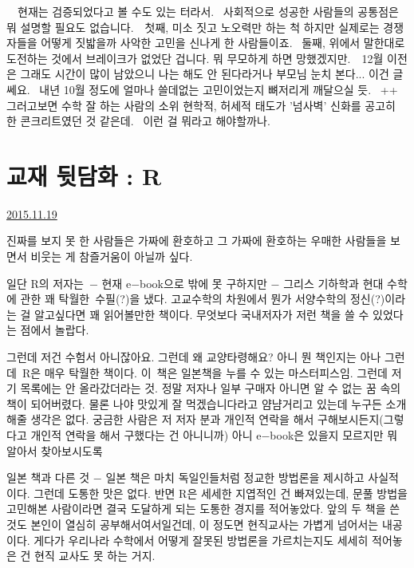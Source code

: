   현재는 검증되었다고 볼 수도 있는 터라서.  사회적으로 성공한 사람들의 공통점은 뭐 설명할 필요도 없습니다.  첫째, 미소 짓고 노오력만 하는 척 하지만 실제로는 경쟁자들을 어떻게 짓밟을까 사악한 고민을 신나게 한 사람들이죠.  둘째, 위에서 말한대로 도전하는 것에서 브레이크가 없었단 겁니다. 뭐 무모하게 하면 망했겠지만.  12월 이전은 그래도 시간이 많이 남았으니 나는 해도 안 된다라거나 부모님 눈치 본다... 이건 글쎄요.  내년 10월 정도에 얼마나 쓸데없는 고민이었는지 뼈저리게 깨달으실 듯.  ++  그러고보면 수학 잘 하는 사람의 소위 현학적, 허세적 태도가 '넘사벽' 신화를 공고히 한 콘크리트였던 것 같은데.  이런 걸 뭐라고 해야할까나.




\section{교재 뒷담화 : R}
\href{https://www.kockoc.com/Apoc/500147}{2015.11.19}

\vspace{5mm}

진짜를 보지 못 한 사람들은 가짜에 환호하고
그 가짜에 환호하는 우매한 사람들을 보면서 비웃는 게 참즐거움이 아닐까 싶다.
\vspace{5mm}

일단 R의 저자는 $-$ 현재 e$-$book으로 밖에 못 구하지만 $-$
그리스 기하학과 현대 수학에 관한 꽤 탁월한 수필(?)을 냈다.
고교수학의 차원에서 뭔가 서양수학의 정신(?)이라는 걸 알고싶다면 꽤 읽어볼만한 책이다.
무엇보다 국내저자가 저런 책을 쓸 수 있었다는 점에서 놀랍다.
\vspace{5mm}

그런데 저건 수험서 아니잖아요. 그런데 왜 교양타령해요? 아니 뭔 책인지는 아나
그런데 R은 매우 탁월한 책이다. 이 책은 일본책을 누를 수 있는 마스터피스임.
그런데 저기 목록에는 안 올라갔더라는 것. 정말 저자나 일부 구매자 아니면 알 수 없는 꿈 속의 책이 되어버렸다.
물론 나야 맛있게 잘 먹겠습니다라고 얌냠거리고 있는데 누구든 소개해줄 생각은 없다.
궁금한 사람은 저 저자 분과 개인적 연락을 해서 구해보시든지(그렇다고 개인적 연락을 해서 구했다는 건 아니니까)
아니 e$-$book은 있을지 모르지만 뭐 알아서 찾아보시도록
\vspace{5mm}

일본 책과 다른 것 $-$ 일본 책은 마치 독일인들처럼 정교한 방법론을 제시하고 사실적이다. 그런데 도통한 맛은 없다.
반면 R은 세세한 지엽적인 건 빠져있는데, 문풀 방법을 고민해본 사람이라면 결국 도달하게 되는 도통한 경지를 적어놓았다.
앞의 두 책을 쓴 것도 본인이 열심히 공부해서여서일건데, 이 정도면 현직교사는 가볍게 넘어서는 내공이다.
게다가 우리나라 수학에서 어떻게 잘못된 방법론을 가르치는지도 세세히 적어놓은 건 현직 교사도 못 하는 거지.
\vspace{5mm}

